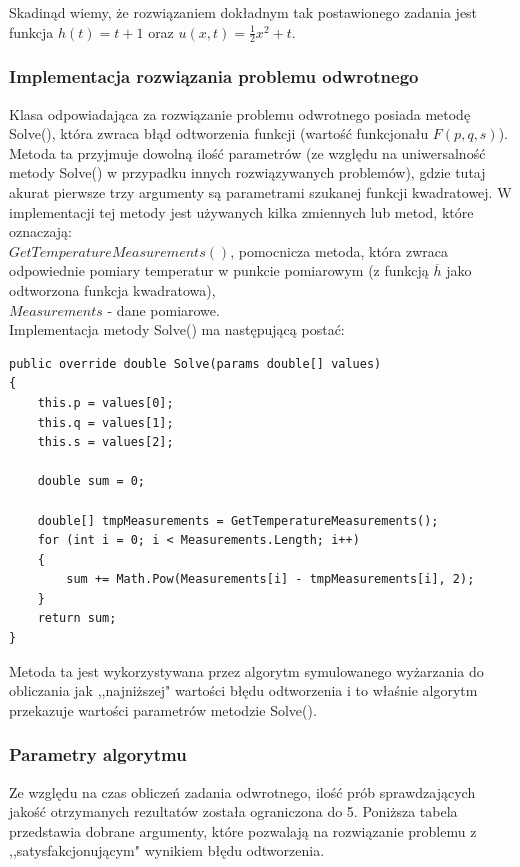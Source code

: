 \documentclass[twoside]{projektInzynierskiMS1}
\newcommand{\si}{ś}
\begin{document}
Skadinąd wiemy, że rozwiązaniem dokładnym tak postawionego zadania jest funkcja $h(t) = t+1$ oraz $u(x, t) = \frac{1}{2}x^2 +t$.

\subsubsection{Implementacja rozwiązania problemu odwrotnego}

Klasa odpowiadająca za rozwiązanie problemu odwrotnego posiada metodę Solve(), która zwraca błąd odtworzenia funkcji (warto\si ć funkcjonału $F(p, q, s)$). Metoda ta przyjmuje dowolną ilo\si ć parametrów (ze względu na uniwersalno\si ć metody Solve() w przypadku innych rozwiązywanych problemów), gdzie tutaj akurat pierwsze trzy argumenty są parametrami szukanej funkcji kwadratowej. W implementacji tej metody jest używanych kilka zmiennych lub metod, które oznaczają:\\

\noindent $GetTemperatureMeasurements()$, pomocnicza metoda, która zwraca odpowiednie pomiary temperatur w punkcie pomiarowym (z funkcją $\overline{h}$ jako odtworzona funkcja kwadratowa), \\
\noindent $Measurements$ - dane pomiarowe. \\

Implementacja metody Solve() ma następującą postać:

\begin{verbatim}
public override double Solve(params double[] values)
{
    this.p = values[0];
    this.q = values[1];
    this.s = values[2];

    double sum = 0;

    double[] tmpMeasurements = GetTemperatureMeasurements();
    for (int i = 0; i < Measurements.Length; i++)
    {
        sum += Math.Pow(Measurements[i] - tmpMeasurements[i], 2);
    }
    return sum;
}
\end{verbatim}

\newpage
Metoda ta jest wykorzystywana przez algorytm symulowanego wyżarzania do obliczania jak ,,najniższej" warto\si ci błędu odtworzenia i to wła\si nie algorytm przekazuje warto\si ci parametrów metodzie Solve().

\subsubsection{Parametry algorytmu}
Ze względu na czas obliczeń zadania odwrotnego, ilo\si ć prób sprawdzających jako\si ć otrzymanych rezultatów została ograniczona do 5. Poniższa tabela przedstawia dobrane argumenty, które pozwalają na rozwiązanie problemu z ,,satysfakcjonującym" wynikiem błędu odtworzenia. \\
\end{document}
